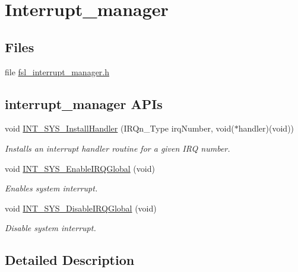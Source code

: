 \hypertarget{group__interrupt__manager}{}\section{Interrupt\+\_\+manager}
\label{group__interrupt__manager}
\subsection*{Files}
\begin{DoxyCompactItemize}
\item 
file \hyperlink{fsl__interrupt__manager_8h}{fsl\+\_\+interrupt\+\_\+manager.\+h}
\end{DoxyCompactItemize}
\subsection*{interrupt\+\_\+manager A\+P\+Is}
\begin{DoxyCompactItemize}
\item 
void \hyperlink{group__interrupt__manager_ga19d827221da261b06af2151b71dfbe15}{I\+N\+T\+\_\+\+S\+Y\+S\+\_\+\+Install\+Handler} (I\+R\+Qn\+\_\+\+Type irq\+Number, void($\ast$handler)(void))
\begin{DoxyCompactList}\small\item\em Installs an interrupt handler routine for a given I\+RQ number. \end{DoxyCompactList}\item 
void \hyperlink{group__interrupt__manager_ga47c4071dcc0386c51428e829c37ba7ce}{I\+N\+T\+\_\+\+S\+Y\+S\+\_\+\+Enable\+I\+R\+Q\+Global} (void)
\begin{DoxyCompactList}\small\item\em Enables system interrupt. \end{DoxyCompactList}\item 
void \hyperlink{group__interrupt__manager_gaca773cf6aa35333ae74934811f73bdc5}{I\+N\+T\+\_\+\+S\+Y\+S\+\_\+\+Disable\+I\+R\+Q\+Global} (void)
\begin{DoxyCompactList}\small\item\em Disable system interrupt. \end{DoxyCompactList}\end{DoxyCompactItemize}


\subsection{Detailed Description}


